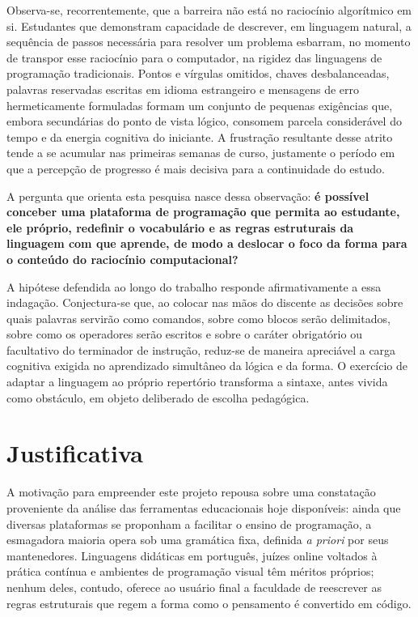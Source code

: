 Observa-se, recorrentemente, que a barreira não está no raciocínio algorítmico em si. Estudantes que demonstram capacidade de descrever, em linguagem natural, a sequência de passos necessária para resolver um problema esbarram, no momento de transpor esse raciocínio para o computador, na rigidez das linguagens de programação tradicionais. Pontos e vírgulas omitidos, chaves desbalanceadas, palavras reservadas escritas em idioma estrangeiro e mensagens de erro hermeticamente formuladas formam um conjunto de pequenas exigências que, embora secundárias do ponto de vista lógico, consomem parcela considerável do tempo e da energia cognitiva do iniciante. A frustração resultante desse atrito tende a se acumular nas primeiras semanas de curso, justamente o período em que a percepção de progresso é mais decisiva para a continuidade do estudo.

A pergunta que orienta esta pesquisa nasce dessa observação: \textbf{é possível conceber uma plataforma de programação que permita ao estudante, ele próprio, redefinir o vocabulário e as regras estruturais da linguagem com que aprende, de modo a deslocar o foco da forma para o conteúdo do raciocínio computacional?}

A hipótese defendida ao longo do trabalho responde afirmativamente a essa indagação. Conjectura-se que, ao colocar nas mãos do discente as decisões sobre quais palavras servirão como comandos, sobre como blocos serão delimitados, sobre como os operadores serão escritos e sobre o caráter obrigatório ou facultativo do terminador de instrução, reduz-se de maneira apreciável a carga cognitiva exigida no aprendizado simultâneo da lógica e da forma. O exercício de adaptar a linguagem ao próprio repertório transforma a sintaxe, antes vivida como obstáculo, em objeto deliberado de escolha pedagógica.

\section{Justificativa}

A motivação para empreender este projeto repousa sobre uma constatação proveniente da análise das ferramentas educacionais hoje disponíveis: ainda que diversas plataformas se proponham a facilitar o ensino de programação, a esmagadora maioria opera sob uma gramática fixa, definida \textit{a priori} por seus mantenedores. Linguagens didáticas em português, juízes online voltados à prática contínua e ambientes de programação visual têm méritos próprios; nenhum deles, contudo, oferece ao usuário final a faculdade de reescrever as regras estruturais que regem a forma como o pensamento é convertido em código.


